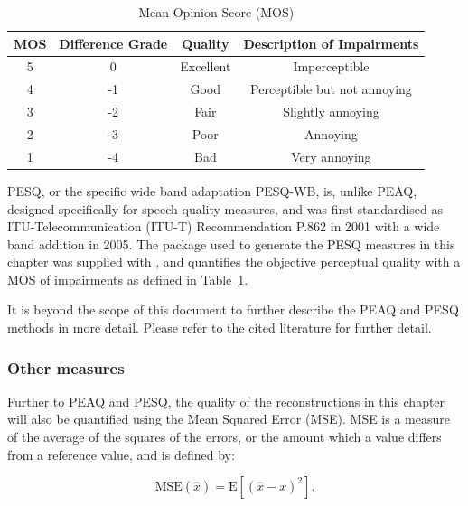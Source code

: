 \begin{table}\begin{center}
\caption{Mean Opinion Score (MOS)}
\label{tab:MOS}
\begin{tabular}{|c|c|c|c|}\hline
MOS & Difference Grade  & Quality       & Description of Impairments  \\ \hline
5   & 0                 & Excellent     & Imperceptible               \\
4   & -1                & Good          & Perceptible but not annoying\\
3   & -2                & Fair          & Slightly annoying           \\
2   & -3                & Poor          & Annoying                    \\
1   & -4                & Bad           & Very annoying               \\ \hline
\end{tabular}\end{center}\end{table}

PESQ, or the specific wide band adaptation PESQ-WB\cite{P862-2-2005}, is, unlike PEAQ, designed specifically for speech quality measures, and was first standardised as ITU-Telecommunication (ITU-T) Recommendation P.862 in 2001 with a wide band addition in 2005\cite{P862-2-2005}. The package used to generate the PESQ measures in this chapter was supplied with \cite{Loizou2007}, and quantifies the objective perceptual quality with a MOS of impairments as defined in Table~\ref{tab:MOS}.

It is beyond the scope of this document to further describe the PEAQ and PESQ methods in more detail. Please refer to the cited literature for further detail.

\subsubsection{Other measures}
Further to PEAQ and PESQ, the quality of the reconstructions in this chapter will also be quantified using the Mean Squared Error (MSE). MSE is a measure of the average of the squares of the errors, or the amount which a value differs from a reference value, and is defined by:

\begin{equation}\label{eq:MSEdef}
\textrm{MSE}\left(\hat{x}\right) = \textrm{E} \left[ \left( \hat{x} - x \right)^2\right].
\end{equation}

